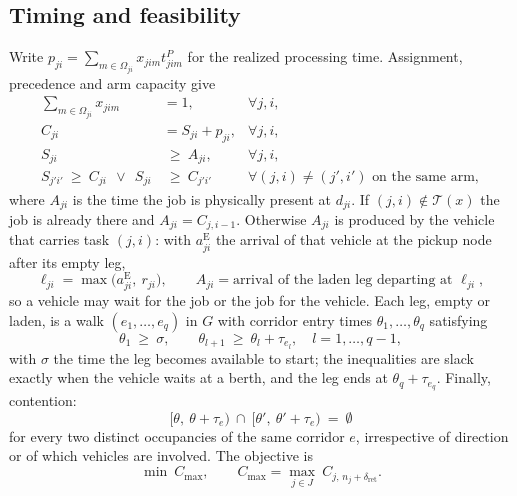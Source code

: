 \documentclass[manuscript,screen,review]{acmart}
\begin{document}
\subsection{Timing and feasibility}

Write $p_{ji}=\sum_{m\in\Omega_{ji}}x_{jim}t^P_{jim}$ for the realized
processing time. Assignment, precedence and arm capacity give
\begin{align}
\sum_{m\in\Omega_{ji}} x_{jim} &= 1, & \forall j,i,
\label{eq:assign}\\
C_{ji} &= S_{ji}+p_{ji}, & \forall j,i,
\label{eq:dur}\\
S_{ji} &\ \ge\ A_{ji}, & \forall j,i,
\label{eq:material}\\
S_{j'i'}\ \ge\ C_{ji}\ \ \vee\ \ S_{ji} &\ \ge\ C_{j'i'}
& \forall (j,i)\neq(j',i') \text{ on the same arm},
\label{eq:disj}
\end{align}
where $A_{ji}$ is the time the job is physically present at $d_{ji}$. If
$(j,i)\notin\mathcal{T}(x)$ the job is already there and $A_{ji}=C_{j,i-1}$.
Otherwise $A_{ji}$ is produced by the vehicle that carries task $(j,i)$: with
$a^{\mathrm{E}}_{ji}$ the arrival of that vehicle at the pickup node after its
empty leg,
\begin{equation}
\label{eq:load}
\ell_{ji}=\max\bigl(a^{\mathrm{E}}_{ji},\ r_{ji}\bigr),
\qquad
A_{ji}=\text{arrival of the laden leg departing at } \ell_{ji},
\end{equation}
so a vehicle may wait for the job or the job for the vehicle. Each leg, empty or
laden, is a walk $(e_1,\dots,e_q)$ in $G$ with corridor entry times
$\theta_1,\dots,\theta_q$ satisfying
\begin{equation}
\label{eq:walk}
\theta_1 \ \ge\ \sigma, \qquad
\theta_{l+1}\ \ge\ \theta_l+\tau_{e_l}, \quad l=1,\dots,q-1,
\end{equation}
with $\sigma$ the time the leg becomes available to start; the inequalities are
slack exactly when the vehicle waits at a berth, and the leg ends at
$\theta_q+\tau_{e_q}$. Finally, contention:
\begin{equation}
\label{eq:excl}
\bigl[\theta,\ \theta+\tau_e\bigr)\ \cap\
\bigl[\theta',\ \theta'+\tau_e\bigr)\ =\ \emptyset
\end{equation}
for every two distinct occupancies of the same corridor $e$, irrespective of
direction or of which vehicles are involved. The objective is
\begin{equation}
\label{eq:obj}
\min\ C_{\max},\qquad
C_{\max}=\max_{j\in J}\ C_{j,\,n_j+\delta_{\mathrm{ret}}} .
\end{equation}
\end{document}
